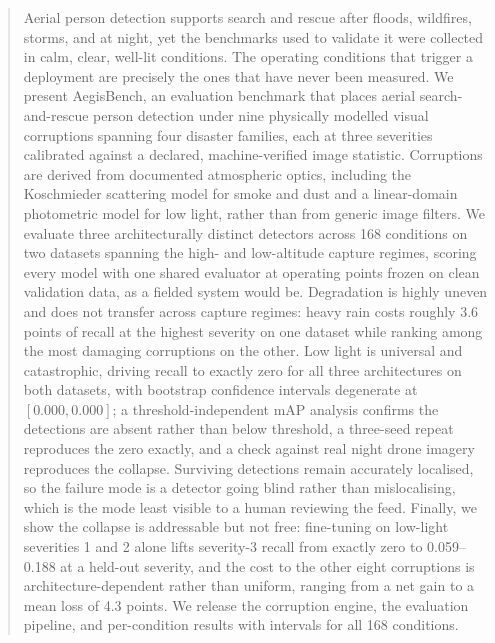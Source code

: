 \begin{abstract}
Aerial person detection supports search and rescue after floods,
wildfires, storms, and at night, yet the benchmarks used to validate it
were collected in calm, clear, well-lit conditions. The operating
conditions that trigger a deployment are precisely the ones that have
never been measured. We present AegisBench, an evaluation benchmark that
places aerial search-and-rescue person detection under nine physically
modelled visual corruptions spanning four disaster families, each at
three severities calibrated against a declared, machine-verified image
statistic. Corruptions are derived from documented atmospheric optics,
including the Koschmieder scattering model for smoke and dust and a
linear-domain photometric model for low light, rather than from generic
image filters. We evaluate three architecturally distinct detectors
across 168 conditions on two datasets spanning the high- and
low-altitude capture regimes, scoring every model with one shared
evaluator at operating points frozen on clean validation data, as a
fielded system would be. Degradation is highly uneven and does not
transfer across capture regimes: heavy rain costs roughly 3.6 points of
recall at the highest severity on one dataset while ranking among the
most damaging corruptions on the other. Low light is universal and
catastrophic, driving recall to exactly zero for all three architectures
on both datasets, with bootstrap confidence intervals degenerate at
$[0.000, 0.000]$; a threshold-independent mAP analysis confirms the
detections are absent rather than below threshold, a three-seed repeat
reproduces the zero exactly, and a check against real night drone
imagery reproduces the collapse. Surviving detections remain accurately
localised, so the failure mode is a detector going blind rather than
mislocalising, which is the mode least visible to a human reviewing the
feed. Finally, we show the collapse is addressable but not free:
fine-tuning on low-light severities 1 and 2 alone lifts severity-3
recall from exactly zero to 0.059--0.188 at a held-out severity, and the
cost to the other eight corruptions is architecture-dependent rather
than uniform, ranging from a net gain to a mean loss of 4.3 points. We
release the corruption engine, the evaluation pipeline, and per-condition
results with intervals for all 168 conditions.
\end{abstract}
